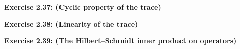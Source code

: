 \documentclass{article}
\begin{document}
\bigskip

\begin{framed}
    \noindent \textbf{Exercise 2.37: (Cyclic property of the trace)}
    
    \medskip
    
    
\end{framed}

\bigskip

\begin{framed}
    \noindent \textbf{Exercise 2.38: (Linearity of the trace)}
    
    \medskip
    
    
\end{framed}

\bigskip

\begin{framed}
    \noindent \textbf{Exercise 2.39: (The Hilbert–Schmidt inner product on operators)}
    
    \medskip
    
    
\end{framed}

\bigskip
\end{document}
